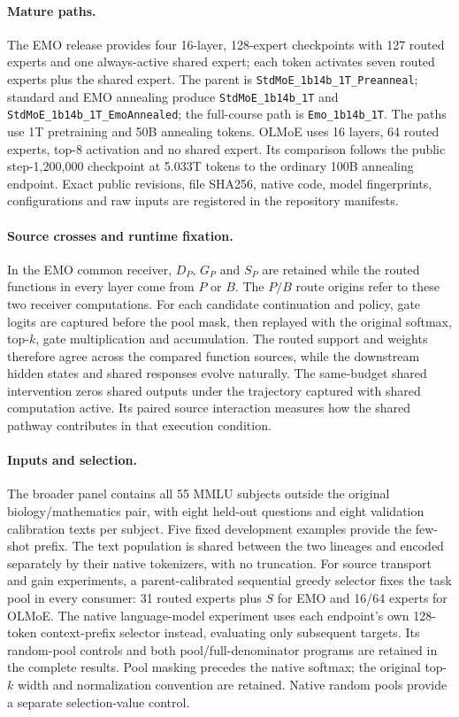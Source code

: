 \documentclass[10pt,twocolumn]{article}
\begin{document}
\paragraph{Mature paths.}
The EMO release provides four 16-layer, 128-expert checkpoints with 127 routed experts and one always-active shared expert; each token activates seven routed experts plus the shared expert.
The parent is \texttt{StdMoE\_1b14b\_1T\_Preanneal}; standard and EMO annealing produce \texttt{StdMoE\_1b14b\_1T} and \texttt{StdMoE\_1b14b\_1T\_EmoAnnealed}; the full-course path is \texttt{Emo\_1b14b\_1T}.
The paths use 1T pretraining and 50B annealing tokens.
OLMoE uses 16 layers, 64 routed experts, top-8 activation and no shared expert.
Its comparison follows the public step-1,200,000 checkpoint at 5.033T tokens to the ordinary 100B annealing endpoint.
Exact public revisions, file SHA256, native code, model fingerprints, configurations and raw inputs are registered in the repository manifests.

\paragraph{Source crosses and runtime fixation.}
In the EMO common receiver, $D_P$, $G_P$ and $S_P$ are retained while the routed functions in every layer come from $P$ or $B$.
The $P/B$ route origins refer to these two receiver computations.
For each candidate continuation and policy, gate logits are captured before the pool mask, then replayed with the original softmax, top-$k$, gate multiplication and accumulation.
The routed support and weights therefore agree across the compared function sources, while the downstream hidden states and shared responses evolve naturally.
The same-budget shared intervention zeros shared outputs under the trajectory captured with shared computation active.
Its paired source interaction measures how the shared pathway contributes in that execution condition.

\paragraph{Inputs and selection.}
The broader panel contains all 55 MMLU subjects outside the original biology/mathematics pair, with eight held-out questions and eight validation calibration texts per subject.
Five fixed development examples provide the few-shot prefix.
The text population is shared between the two lineages and encoded separately by their native tokenizers, with no truncation.
For source transport and gain experiments, a parent-calibrated sequential greedy selector fixes the task pool in every consumer: 31 routed experts plus $S$ for EMO and 16/64 experts for OLMoE.
The native language-model experiment uses each endpoint's own 128-token context-prefix selector instead, evaluating only subsequent targets. Its random-pool controls and both pool/full-denominator programs are retained in the complete results.
Pool masking precedes the native softmax; the original top-$k$ width and normalization convention are retained.
Native random pools provide a separate selection-value control.
\end{document}
